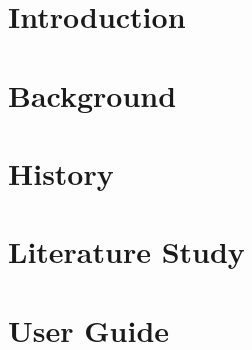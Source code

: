 \documentclass[10pt]{article}
\begin{document}

\newpage
\index{}
\newpage
\section*{Introduction}

\section*{Background}

\section*{History}

\section*{Literature Study}

\section*{User Guide}
\end{document}
